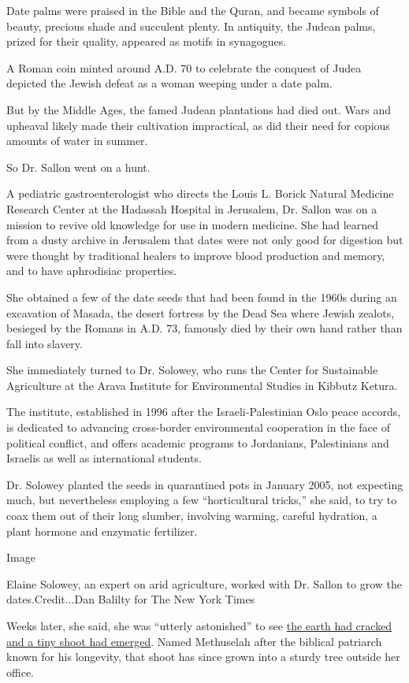 Date palms were praised in the Bible and the Quran, and became symbols
of beauty, precious shade and succulent plenty. In antiquity, the Judean
palms, prized for their quality, appeared as motifs in synagogues.

A Roman coin minted around A.D. 70 to celebrate the conquest of Judea
depicted the Jewish defeat as a woman weeping under a date palm.

But by the Middle Ages, the famed Judean plantations had died out. Wars
and upheaval likely made their cultivation impractical, as did their
need for copious amounts of water in summer.

So Dr. Sallon went on a hunt.

A pediatric gastroenterologist who directs the Louis L. Borick Natural
Medicine Research Center at the Hadassah Hospital in Jerusalem, Dr.
Sallon was on a mission to revive old knowledge for use in modern
medicine. She had learned from a dusty archive in Jerusalem that dates
were not only good for digestion but were thought by traditional healers
to improve blood production and memory, and to have aphrodisiac
properties.

She obtained a few of the date seeds that had been found in the 1960s
during an excavation of Masada, the desert fortress by the Dead Sea
where Jewish zealots, besieged by the Romans in A.D. 73, famously died
by their own hand rather than fall into slavery.

She immediately turned to Dr. Solowey, who runs the Center for
Sustainable Agriculture at the Arava Institute for Environmental Studies
in Kibbutz Ketura.

The institute, established in 1996 after the Israeli-Palestinian Oslo
peace accords, is dedicated to advancing cross-border environmental
cooperation in the face of political conflict, and offers academic
programs to Jordanians, Palestinians and Israelis as well as
international students.

Dr. Solowey planted the seeds in quarantined pots in January 2005, not
expecting much, but nevertheless employing a few ``horticultural
tricks,'' she said, to try to coax them out of their long slumber,
involving warming, careful hydration, a plant hormone and enzymatic
fertilizer.

Image

Elaine Solowey, an expert on arid agriculture, worked with Dr. Sallon to
grow the dates.Credit...Dan Balilty for The New York Times

Weeks later, she said, she was ``utterly astonished'' to see
\href{https://www.nytimes3xbfgragh.onion/2005/06/12/world/middleeast/after-2000-years-a-seed-from-ancient-judea-sprouts.html?searchResultPosition=1}{the
earth had cracked and a tiny shoot had emerged}. Named Methuselah after
the biblical patriarch known for his longevity, that shoot has since
grown into a sturdy tree outside her office.

